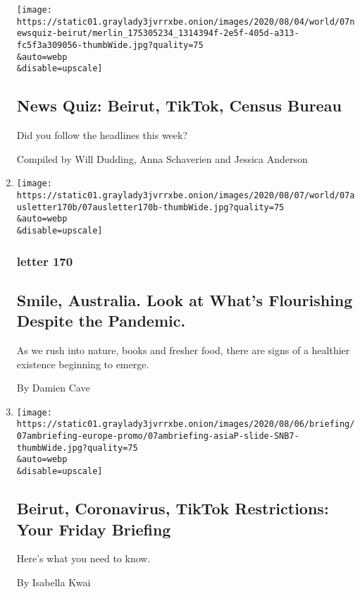 \begin{enumerate}
  \texttt{[image: https://static01.graylady3jvrrxbe.onion/images/2020/08/04/world/07newsquiz-beirut/merlin\_175305234\_1314394f-2e5f-405d-a313-fc5f3a309056-thumbWide.jpg?quality=75\\\&auto=webp\\\&disable=upscale]}

  \hypertarget{news-quiz-beirut-tiktok-census-bureau}{%
  \subsection{News Quiz: Beirut, TikTok, Census
  Bureau}\label{news-quiz-beirut-tiktok-census-bureau}}

  Did you follow the headlines this week?

  Compiled by Will Dudding, Anna Schaverien and Jessica Anderson
\item
  \href{/2020/08/07/world/australia/coronavirus-joys-ocean-books-food.html}{}

  \texttt{[image: https://static01.graylady3jvrrxbe.onion/images/2020/08/07/world/07ausletter170b/07ausletter170b-thumbWide.jpg?quality=75\\\&auto=webp\\\&disable=upscale]}

  \hypertarget{letter-170}{%
  \subsubsection{letter 170}\label{letter-170}}

  \hypertarget{smile-australia-look-at-whats-flourishing-despite-the-pandemic}{%
  \subsection{Smile, Australia. Look at What's Flourishing Despite the
  Pandemic.}\label{smile-australia-look-at-whats-flourishing-despite-the-pandemic}}

  As we rush into nature, books and fresher food, there are signs of a
  healthier existence beginning to emerge.

  By Damien Cave
\item
  \href{/2020/08/06/briefing/beirut-tiktok-coronavirus.html}{}

  \texttt{[image: https://static01.graylady3jvrrxbe.onion/images/2020/08/06/briefing/07ambriefing-europe-promo/07ambriefing-asiaP-slide-SNB7-thumbWide.jpg?quality=75\\\&auto=webp\\\&disable=upscale]}

  \hypertarget{beirut-coronavirus-tiktok-restrictions-your-friday-briefing}{%
  \subsection{Beirut, Coronavirus, TikTok Restrictions: Your Friday
  Briefing}\label{beirut-coronavirus-tiktok-restrictions-your-friday-briefing}}

  Here's what you need to know.

  By Isabella Kwai
\end{enumerate}

